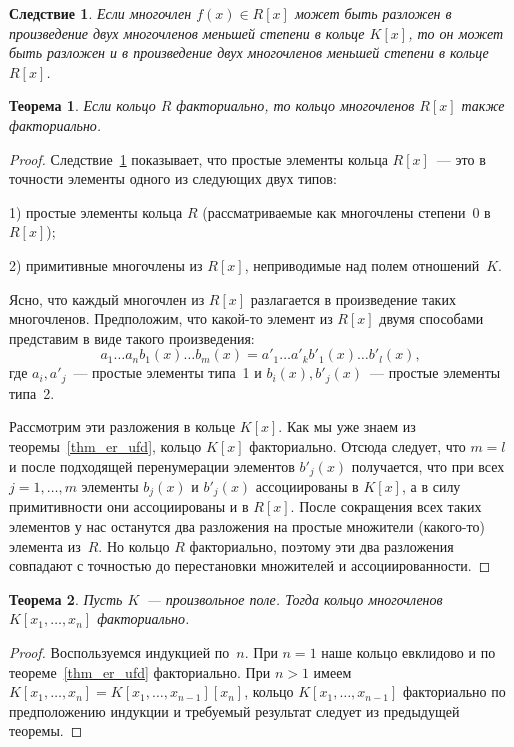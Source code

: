 \documentclass[a4paper, 12pt]{article}
\newtheorem{theorem}{Теорема}
\newtheorem{corollary}{Следствие}
\theoremstyle{definition}
\theoremstyle{remark}
\begin{document}
\begin{corollary} \label{cc}
Если многочлен $f(x)\in R[x]$ может быть разложен в произведение
двух многочленов меньшей степени в кольце $K[x]$, то он может быть
разложен и в произведение двух многочленов меньшей степени в кольце
$R[x]$.
\end{corollary}

\begin{theorem}
Если кольцо $R$ факториально, то кольцо многочленов $R[x]$ также
факториально.
\end{theorem}

\begin{proof}
Следствие~\ref{cc} показывает, что простые элементы кольца
$R[x]$~--- это в точности элементы одного из следующих двух типов:

1) простые элементы кольца $R$ (рассматриваемые как многочлены
степени~$0$ в $R[x]$);

2) примитивные многочлены из $R[x]$, неприводимые над полем
отношений~$K$.

Ясно, что каждый многочлен из $R[x]$ разлагается в произведение
таких многочленов. Предположим, что какой-то элемент из $R[x]$ двумя
способами представим в виде такого произведения:
$$
a_1 \ldots a_n b_1(x) \ldots b_m(x) = a'_1 \ldots a'_k b'_1(x)
\ldots b'_l(x),
$$
где $a_i, a'_j$~--- простые элементы типа~1 и $b_i(x), b'_j(x)$~---
простые элементы типа~2.

Рассмотрим эти разложения в кольце $K[x]$. Как мы уже знаем из
теоремы~\ref{thm_er_ufd}, кольцо $K[x]$ факториально. Отсюда
следует, что $m = l$ и после подходящей перенумерации элементов
$b'_j(x)$ получается, что при всех $j = 1, \ldots, m$ элементы
$b_j(x)$ и $b'_j(x)$ ассоциированы в $K[x]$, а в силу примитивности
они ассоциированы и в $R[x]$. После сокращения всех таких элементов
у нас останутся два разложения на простые множители (какого-то)
элемента из~$R$. Но кольцо $R$ факториально, поэтому эти два
разложения совпадают с точностью до перестановки множителей и
ассоциированности.
\end{proof}

\begin{theorem}
Пусть $K$~--- произвольное поле. Тогда кольцо многочленов
$K[x_1,\ldots,x_n]$ факториально.
\end{theorem}

\begin{proof}
Воспользуемся индукцией по~$n$. При $n=1$ наше кольцо евклидово и по
теореме~\ref{thm_er_ufd} факториально. При $n > 1$ имеем $K[x_1,
\ldots, x_n] = K[x_1, \ldots, x_{n-1}][x_n]$, кольцо $K[x_1, \ldots,
x_{n-1}]$ факториально по предположению индукции и требуемый
результат следует из предыдущей теоремы.
\end{proof}
\end{document}
